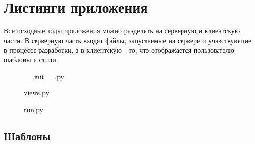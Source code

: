 \captionsetup[figure]{labelformat=mylisting}

\chapter{Листинги приложения}

Все исходные коды приложения можно разделить на серверную и клиентскую части. В серверную часть входят файлы, запускаемые на сервере и учавствующие в процессе разработки, а в клиентскую - то, что отображается пользователю - шаблоны и стили.


\begin{figure}[h!]
	\caption{\_\_init\_\_.py}
\end{figure}


\begin{figure}[h!]
	\caption{views.py}
\end{figure}

	
\begin{figure}[h!]
	\caption{run.py}
\end{figure}

\section{Шаблоны}

%

%

%
